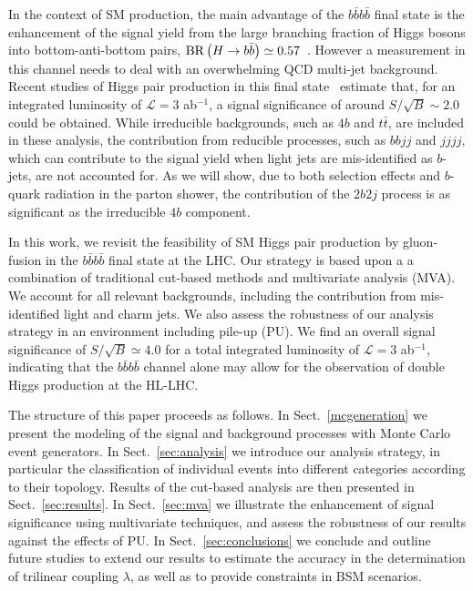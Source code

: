 In the context of SM production,
the main advantage of the $b\bar{b}b\bar{b}$ final state is the
enhancement of the signal yield
from the large branching fraction of Higgs bosons into bottom-anti-bottom
pairs, ${\rm BR}\left( H\to b\bar{b}\right)\simeq 0.57$~\cite{Dittmaier:2012vm}.
%
However a measurement in this channel
needs to deal with an overwhelming QCD multi-jet background.
%
Recent studies of Higgs pair production in this
final state~\cite{Wardrope:2014kya,deLima:2014dta}
estimate that, for an integrated
luminosity of
$\mathcal{L}=3$ ab$^{-1}$,
a signal significance of around $S/\sqrt{B}\sim 2.0$ could be obtained.
%
While irreducible backgrounds, such as $4b$ and
$t\bar{t}$, are included in these analysis, the contribution
from reducible processes, such as $bbjj$ and
$jjjj$, which can contribute to the signal yield when 
light jets are mis-identified as $b$-jets,
are not accounted for.
%
As we will show, due to both
selection effects and $b$-quark radiation in the
parton shower, the
contribution of the $2b2j$ process is as significant as
the irreducible $4b$ component.

In this work, we revisit the feasibility of SM Higgs pair production by
gluon-fusion
in the $b\bar{b}b\bar{b}$ final state at the LHC.
%
 Our strategy is based upon a a combination of traditional cut-based
 methods and multivariate analysis (MVA).
  We account for  all relevant
  backgrounds, including the contribution from mis-identified
  light and charm jets.
  We also assess the robustness of our analysis strategy in
  an environment including pile-up (PU).
  We find an overall signal significance of $S/\sqrt{B}\simeq 4.0$
  for a total integrated
  luminosity of $\mathcal{L}=3$ ab$^{-1}$,
   indicating
  that the $b\bar{b}b\bar{b}$ channel
alone may allow for the observation of double Higgs production
  at the HL-LHC.
% 
  
The structure of this paper proceeds as follows.
%
In Sect.~\ref{mcgeneration} we present the modeling of the signal
and background processes with Monte Carlo event generators.
%
In Sect.~\ref{sec:analysis}
we introduce our analysis strategy, in particular
the classification of individual events into
different categories according to their topology.
%
Results of the cut-based analysis
are then presented in Sect.~\ref{sec:results}.
%
In Sect.~\ref{sec:mva} we illustrate the enhancement of signal
significance using multivariate techniques, and
assess the robustness of our results against the effects of PU.
%
In Sect.~\ref{sec:conclusions} we conclude and outline
future studies to extend our results to estimate the accuracy
in the determination of trilinear coupling $\lambda$, as well as
to provide
 constraints in
BSM scenarios.

